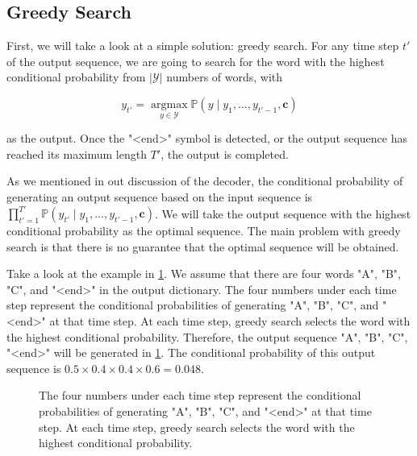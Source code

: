 \subsection{Greedy Search}\label{subsec:greedy-search}

First, we will take a look at a simple solution: greedy search. For any time step $t'$ of the output sequence, we are going to search for the word with the highest conditional probability from $|\mathcal{Y}|$ numbers of words, with

$$y_{t'} = \operatorname*{argmax}_{y \in \mathcal{Y}} \mathbb{P}(y \mid y_1, \ldots, y_{t'-1}, \boldsymbol{c})$$

as the output.  Once the "<end>" symbol is detected, or the output sequence has reached its maximum length $T'$, the output is completed.

As we mentioned in out discussion of the decoder, the conditional probability of generating an output sequence based on the input sequence is $\prod_{t'=1}^{T'} \mathbb{P}(y_{t'} \mid y_1, \ldots, y_{t'-1}, \boldsymbol{c})$. We will take the output sequence with the highest conditional probability as the optimal sequence. The main problem with greedy search is that there is no guarantee that the optimal sequence will be obtained.

Take a look at the example in \cref{fig:s2s_prob1}. We assume that there are four words "A", "B", "C", and "<end>" in the output dictionary.  The four numbers under each time step represent the conditional probabilities of generating "A", "B", "C", and "<end>" at that time step.  At each time step, greedy search selects the word with the highest conditional probability. Therefore, the output sequence "A", "B", "C", "<end>" will be generated in \cref{fig:s2s_prob1}. The conditional probability of this output sequence is $0.5\times0.4\times0.4\times0.6 = 0.048$.

\begin{figure}[hpt]
	\centering
	
	\caption{The four numbers under each time step represent the conditional probabilities of generating "A", "B", "C", and "<end>" at that time step. At each time step, greedy search selects the word with the highest conditional probability.}
	\label{fig:s2s_prob1}
\end{figure}


